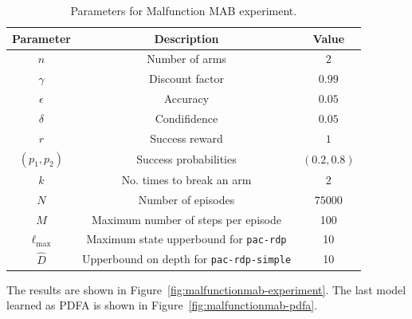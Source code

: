 \documentclass{article}
\begin{document}
\begin{table}[!h]
\centering
    \begin{tabular}{|c|c|c|}
 \hline
 Parameter & Description & Value \\ \hline \hline
 $n$ & Number of arms & $2$\\ \hline
 $\gamma$ & Discount factor & $0.99$\\ \hline
 $\epsilon$ & Accuracy & $0.05$\\ \hline
 $\delta$ & Condifidence & $0.05$\\ \hline
 $r$ & Success reward & $1$\\ \hline
 $(p_1, p_2)$ & Success probabilities & $(0.2, 0.8)$\\ \hline
 $k$ & No. times to break an arm & $2$\\ \hline
 $N$ & Number of episodes & $75000$ \\ \hline
 $M$ & Maximum number of steps per episode & 100 \\ \hline
 $\ell_{\max}$ & Maximum state upperbound for \texttt{pac-rdp} & 10 \\ \hline
 $\hat{D}$ & Upperbound on depth for \texttt{pac-rdp-simple} & 10 \\ \hline
\end{tabular}
\caption{Parameters for Malfunction MAB experiment.}
\label{tab:malfunctionmab-params}
\end{table}

The results are shown in Figure~\ref{fig:malfunctionmab-experiment}.
The last model learned as PDFA is shown in Figure~\ref{fig:malfunctionmab-pdfa}.
\end{document}
